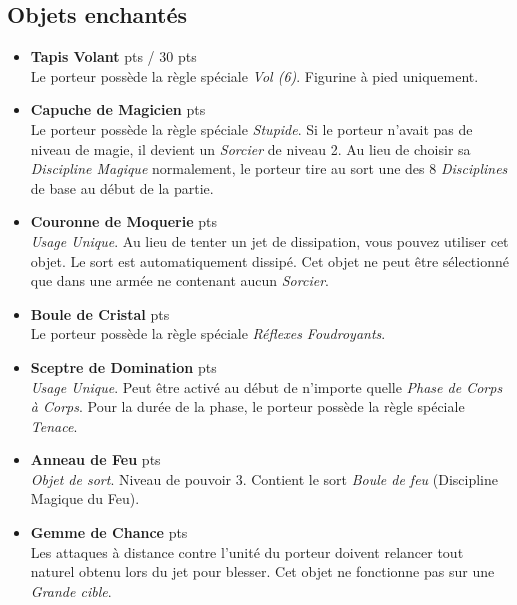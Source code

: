 \newpage

\subsection{Objets enchantés}

\begin{multicols}{2}
\begin{itemize}[label={-}]
\item \textbf{Tapis Volant}  {pts} / 30 {pts} \\
Le porteur possède la règle spéciale \emph{Vol (6)}. Figurine à pied uniquement.

\item \textbf{Capuche de Magicien}  {pts} \\
Le porteur possède la règle spéciale \emph{Stupide}. Si le porteur n'avait pas de niveau de magie, il devient un \emph{Sorcier} de niveau 2. Au lieu de choisir sa \emph{Discipline Magique} normalement, le porteur tire au sort une des 8 \emph{Disciplines} de base au début de la partie.

\item \textbf{Couronne de Moquerie}  {pts} \\
\emph{Usage Unique}. Au lieu de tenter un jet de dissipation, vous pouvez utiliser cet objet. Le sort est automatiquement dissipé. Cet objet ne peut être sélectionné que dans une armée ne contenant aucun \emph{Sorcier}.

\item \textbf{Boule de Cristal}  {pts} \\
Le porteur possède la règle spéciale \emph{Réflexes Foudroyants}.

\item \textbf{Sceptre de Domination}  {pts} \\
\emph{Usage Unique}. Peut être activé au début de n'importe quelle \emph{Phase de Corps à Corps}. Pour la durée de la phase, le porteur possède la règle spéciale \emph{Tenace}.

\item \textbf{Anneau de Feu}  {pts} \\
\emph{Objet de sort}. Niveau de pouvoir 3. Contient le sort \emph{Boule de feu} (Discipline Magique du Feu).

\item \textbf{Gemme de Chance}  {pts} \\
Les attaques à distance contre l'unité du porteur doivent relancer tout  naturel obtenu lors du jet pour blesser. Cet objet ne fonctionne pas sur une \emph{Grande cible}.


\end{itemize}
\end{multicols}

